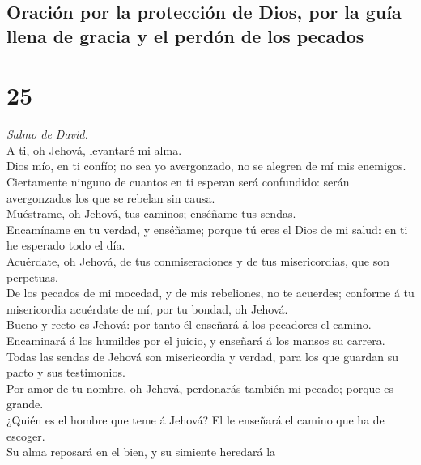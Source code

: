 \hypertarget{oraciuxf3n-por-la-protecciuxf3n-de-dios-por-la-guuxeda-llena-de-gracia-y-el-perduxf3n-de-los-pecados}{%
\subsection{Oración por la protección de Dios, por la guía llena de
gracia y el perdón de los
pecados}\label{oraciuxf3n-por-la-protecciuxf3n-de-dios-por-la-guuxeda-llena-de-gracia-y-el-perduxf3n-de-los-pecados}}

\hypertarget{section-24}{%
\section{25}\label{section-24}}

 \emph{Salmo de David.}\\
A ti, oh Jehová, levantaré mi alma.\\
 Dios mío, en ti confío; no sea yo avergonzado, no se
alegren de mí mis enemigos.\\
 Ciertamente ninguno de cuantos en ti esperan será
confundido: serán avergonzados los que se rebelan sin causa.\\
 Muéstrame, oh Jehová, tus caminos; enséñame tus sendas.\\
 Encamíname en tu verdad, y enséñame; porque tú eres el Dios
de mi salud: en ti he esperado todo el día.\\
 Acuérdate, oh Jehová, de tus conmiseraciones y de tus
misericordias, que son perpetuas.\\
 De los pecados de mi mocedad, y de mis rebeliones, no te
acuerdes; conforme á tu misericordia acuérdate de mí, por tu bondad, oh
Jehová.\\
 Bueno y recto es Jehová: por tanto él enseñará á los
pecadores el camino.\\
 Encaminará á los humildes por el juicio, y enseñará á los
mansos su carrera.\\
 Todas las sendas de Jehová son misericordia y verdad, para
los que guardan su pacto y sus testimonios.\\
 Por amor de tu nombre, oh Jehová, perdonarás también mi
pecado; porque es grande.\\
 ¿Quién es el hombre que teme á Jehová? El le enseñará el
camino que ha de escoger.\\
 Su alma reposará en el bien, y su simiente heredará la
